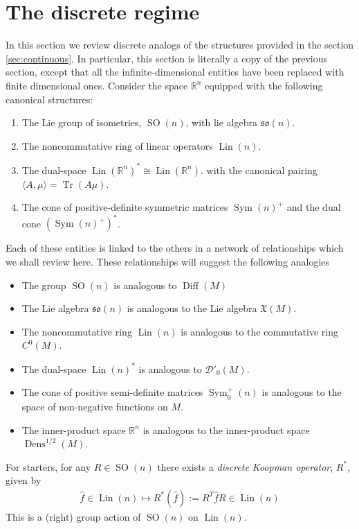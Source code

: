 \documentclass[12pt]{amsart}
\newcommand{\R}{\ensuremath{\mathbb{R}}}
\DeclareMathOperator{\Diff}{Diff}
\DeclareMathOperator{\Dens}{Dens}
\DeclareMathOperator{\SO}{SO}
\DeclareMathOperator{\Sym}{Sym}
\DeclareMathOperator{\Lin}{Lin}
\DeclareMathOperator{\Tr}{Tr}
\begin{document}
\section{The discrete regime}
\label{sec:discrete}
In this section we review discrete analogs of the structures provided in the section \ref{sec:continuous}.
In particular, this section is literally a copy of the previous section, except that all the infinite-dimensional entities have been replaced with finite dimensional ones.
Consider the space $\R^n$ equipped with the following canonical structures:
\begin{enumerate}
	\item The Lie group of isometries, $\SO(n)$, with lie algebra $\mathfrak{so}(n)$.
	\item The noncommutative ring of linear operators $\Lin(n)$.
	\item The dual-space $\Lin(\R^n)^* \cong \Lin(\R^n)$.
	with the canonical pairing $\langle A , \mu \rangle = \Tr(A \mu)$.
	\item The cone of positive-definite symmetric matrices $\Sym(n)^+$ and the dual cone $(\Sym(n)^+)^*$.
\end{enumerate}
Each of these entities is linked to the others in a network of relationships
which we shall review here.
These relationships will suggest the following analogies
\begin{itemize}
	\item The group $\SO(n)$ is analogous to $\Diff(M)$
	\item The Lie algebra $\mathfrak{so}(n)$ is analogous to the Lie algebra $\mathfrak{X}(M)$.
	\item The noncommutative ring $\Lin(n)$ is analogous to the commutative ring $C^0(M)$.
	\item The dual-space $\Lin(n)^*$ is analogous to $\mathcal{D}'_0(M)$.
	\item The cone of positive semi-definite matrices $\Sym_0^+(n)$ is analogous to the space of non-negative functions on $M$.
	\item The inner-product space $\R^n$ is analogous to the inner-product space $\Dens^{1/2}(M)$.
\end{itemize}
For starters, for any $R \in \SO(n)$ there exists a \emph{discrete Koopman operator}, $R^*$, given by
\begin{align*}
	\hat{f} \in \Lin(n) \mapsto R^* ( \hat{f} ) := R^T \hat{f} R \in \Lin(n)
\end{align*}
This is a (right) group action of $\SO(n)$ on $\Lin(n)$.
\end{document}
